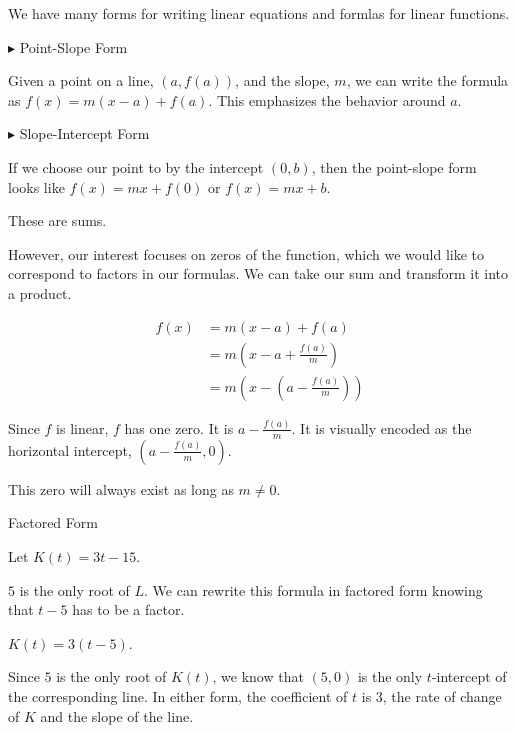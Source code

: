 \documentclass{ximera}
\begin{document}
We have many forms for writing linear equations and formlas for linear functions.



$\blacktriangleright$ Point-Slope Form

Given a point on a line, $(a, f(a))$, and the slope, $m$, we can write the formula as $f(x) = m(x-a) + f(a)$. This emphasizes the behavior around $a$.



$\blacktriangleright$ Slope-Intercept Form

If we choose our point to by the intercept $(0, b)$, then the point-slope form looks like $f(x) = m x + f(0)$ or $f(x) = m x + b$.



These are sums.


However, our interest focuses on zeros of the function, which we would like to correspond to factors in our formulas.  We can take our sum and transform it into a product.




\begin{align*}
f(x) & = m(x-a) + f(a) \\
& = m \left(x - a + \frac{f(a)}{m}\right)  \\
& = m \left(x - \left(a - \frac{f(a)}{m}\right)\right) 
\end{align*}



Since $f$ is linear, $f$ has one zero.  It is $a - \frac{f(a)}{m}$.  It is visually encoded as the horizontal intercept, $\left(a - \frac{f(a)}{m}, 0\right)$.


This zero will always exist as long as $m \ne 0$.



\begin{example}  Factored Form



Let $K(t) = 3t - 15$.


$5$ is the only root of $L$.  We can rewrite this formula in factored form knowing that $t-5$ has to be a factor.


$K(t) = 3(t - 5)$.





\end{example}

Since $5$ is the only root of $K(t)$, we know that $(5, 0)$ is the only $t$-intercept of the corresponding line.  In either form, the coefficient of $t$ is $3$, the rate of change of $K$ and the slope of the line.
\end{document}
